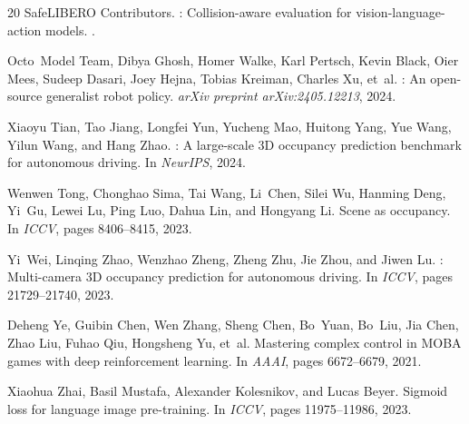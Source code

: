 \documentclass[letterpaper]{article}
\begin{document}
\begin{thebibliography}{20}
{SafeLIBERO Contributors}.
: Collision-aware evaluation for vision-language-action models.
.

Octo~Model Team, Dibya Ghosh, Homer Walke, Karl Pertsch, Kevin Black, Oier Mees, Sudeep Dasari, Joey Hejna, Tobias Kreiman, Charles Xu, et~al.
: An open-source generalist robot policy.
\newblock \emph{arXiv preprint arXiv:2405.12213}, 2024.

Xiaoyu Tian, Tao Jiang, Longfei Yun, Yucheng Mao, Huitong Yang, Yue Wang, Yilun Wang, and Hang Zhao.
: A large-scale 3D occupancy prediction benchmark for autonomous driving.
\newblock In \emph{NeurIPS}, 2024.

Wenwen Tong, Chonghao Sima, Tai Wang, Li~Chen, Silei Wu, Hanming Deng, Yi~Gu, Lewei Lu, Ping Luo, Dahua Lin, and Hongyang Li.
\newblock Scene as occupancy.
\newblock In \emph{ICCV}, pages 8406--8415, 2023.

Yi~Wei, Linqing Zhao, Wenzhao Zheng, Zheng Zhu, Jie Zhou, and Jiwen Lu.
: Multi-camera 3D occupancy prediction for autonomous driving.
\newblock In \emph{ICCV}, pages 21729--21740, 2023.

Deheng Ye, Guibin Chen, Wen Zhang, Sheng Chen, Bo~Yuan, Bo~Liu, Jia Chen, Zhao Liu, Fuhao Qiu, Hongsheng Yu, et~al.
\newblock Mastering complex control in {MOBA} games with deep reinforcement learning.
\newblock In \emph{AAAI}, pages 6672--6679, 2021.

Xiaohua Zhai, Basil Mustafa, Alexander Kolesnikov, and Lucas Beyer.
\newblock Sigmoid loss for language image pre-training.
\newblock In \emph{ICCV}, pages 11975--11986, 2023.

\end{thebibliography}
\end{document}
